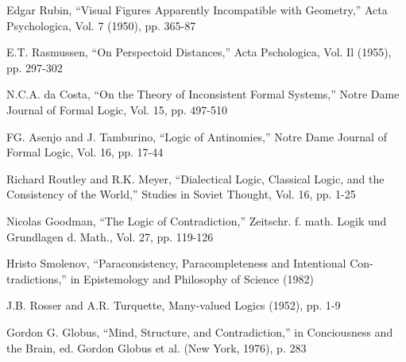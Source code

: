 Edgar Rubin, “Visual Figures Apparently Incompatible with Geometry,” 
Acta Psychologica, Vol. 7 (1950), pp. 365-87 

E.T. Rasmussen, “On Perspectoid Distances,” Acta Pschologica, Vol. Il 
(1955), pp. 297-302 

N.C.A. da Costa, “On the Theory of Inconsistent Formal Systems,” Notre 
Dame Journal of Formal Logic, Vol. 15, pp. 497-510 

FG. Asenjo and J. Tamburino, “Logic of Antinomies,” Notre Dame Journal 
of Formal Logic, Vol. 16, pp. 17-44 


Richard Routley and R.K. Meyer, “Dialectical Logic, Classical Logic, and the 
Consistency of the World,” Studies in Soviet Thought, Vol. 16, pp. 1-25 

Nicolas Goodman, “The Logic of Contradiction,” Zeitschr. f. math. Logik und 
Grundlagen d. Math., Vol. 27, pp. 119-126 

Hristo Smolenov, “Paraconsistency, Paracompleteness and Intentional Con- 
tradictions,” in Epistemology and Philosophy of Science (1982) 

J.B. Rosser and A.R. Turquette, Many-valued Logics (1952), pp. 1-9 

Gordon G. Globus, “Mind, Structure, and Contradiction,” in Conciousness 
and the Brain, ed. Gordon Globus et al. (New York, 1976), p. 283 


